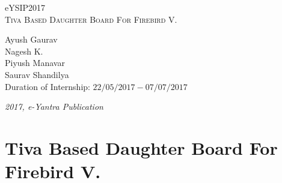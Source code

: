 \documentclass[a4paper,12pt,oneside]{book}
\begin{document}
\begin{titlepage}
\raggedright
{\Large eYSIP2017\\[1cm]}
{\Huge\scshape Tiva Based Daughter Board For Firebird V.  \\[.1in]}
\vfill
\begin{flushright}
{\large Ayush Gaurav \\}
{\large Nagesh K. \\}
{\large Piyush Manavar \\}
{\large Saurav Shandilya \\}
{\large Duration of Internship: $ 22/05/2017-07/07/2017 $ \\}
\end{flushright}
{\itshape 2017, e-Yantra Publication}
\end{titlepage}

\chapter[Project Tag]{Tiva Based Daughter Board For Firebird V.}
\end{document}
